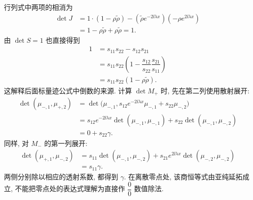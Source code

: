 行列式中两项的相消为
\begin{equation*}
\begin{aligned}
\det J
&=1\cdot(1-\rho\widetilde\rho)
-(\widetilde\rho e^{-2\ii\lambda x})
(-\rho e^{2\ii\lambda x})\\
&=1-\rho\widetilde\rho+\rho\widetilde\rho=1.
\end{aligned}
\end{equation*}
由 $\det S=1$ 也直接得到
\begin{equation*}
\begin{aligned}
1
&=s_{11}s_{22}-s_{12}s_{21}\\
&=s_{11}s_{22}
\left(1-\dfrac{s_{12}}{s_{22}}\dfrac{s_{21}}{s_{11}}\right)\\
&=s_{11}s_{22}(1-\rho\widetilde\rho).
\end{aligned}
\end{equation*}
这解释后面标量迹公式中倒数的来源.
计算 $\det M_+$ 时, 先在第二列使用散射展开:
\begin{equation*}
\begin{aligned}
\det(\mu_{-,1},\mu_{+,2})
&=\det\bigl(\mu_{-,1},
s_{12}e^{-2\ii\lambda x}\mu_{-,1}+s_{22}\mu_{-,2}\bigr)\\
&=s_{12}e^{-2\ii\lambda x}
\det(\mu_{-,1},\mu_{-,1})
+s_{22}\det(\mu_{-,1},\mu_{-,2})\\
&=0+s_{22}\gamma.
\end{aligned}
\end{equation*}
同样, 对 $M_-$ 的第一列展开:
\begin{equation*}
\begin{aligned}
\det(\mu_{+,1},\mu_{-,2})
&=s_{11}\det(\mu_{-,1},\mu_{-,2})
+s_{21}e^{2\ii\lambda x}\det(\mu_{-,2},\mu_{-,2})\\
&=s_{11}\gamma.
\end{aligned}
\end{equation*}
两侧分别除以相应的透射系数, 都得到 $\gamma$.
在离散零点处, 该商恒等式由亚纯延拓成立, 不能把零点处的表达式理解为直接作 $\dfrac{0}{0}$ 数值除法.

